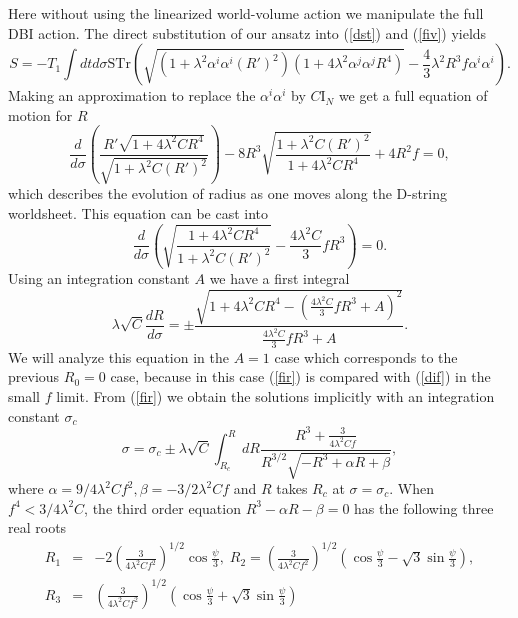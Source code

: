 \documentclass[12pt,a4paper]{article}
\newcommand{\la}{\lambda}
\newcommand{\al}{\alpha}
\begin{document}
Here without using the linearized world-volume action we manipulate
the full DBI action. The direct substitution of our ansatz into 
(\ref{dst}) and (\ref{fiv}) yields
\begin{equation}
S = -T_1 \int dtd\sigma \mathrm{STr} (\sqrt{(1+\la^2\al^i\al^i(R')^2)
(1 + 4\la^2\al^j\al^jR^4)} - \frac{4}{3}\la^2R^3f\al^i\al^i ).
\label{ful}\end{equation}
Making an approximation to replace the $\al^i\al^i$ by $C\mathrm{I}_N$
we get a full equation of motion for $R$
\begin{equation}
\frac{d}{d\sigma} \left( \frac{R'\sqrt{1+4\la^2CR^4}}
{\sqrt{1+\la^2C(R')^2}}\right) - 8R^3 
\sqrt{\frac{1+\la^2C(R')^2}{1+4\la^2CR^4}} + 4R^2f = 0,
\end{equation}
which describes the evolution of radius as one moves along the 
D-string worldsheet.
This equation can be cast into
\begin{equation}
\frac{d}{d\sigma}\left( \sqrt{\frac{1+4\la^2CR^4}{1+\la^2C(R')^2}}
- \frac{4\la^2C}{3}fR^3 \right) = 0.
\label{cas}\end{equation}
Using an integration constant $A$ we have a first integral
\begin{equation}
\la\sqrt{C}\frac{dR}{d\sigma} = \pm \frac{\sqrt{1+4\la^2CR^4-
(\frac{4\la^2C}{3}fR^3 + A)^2}}{\frac{4\la^2C}{3}fR^3 + A}.
\label{fir}\end{equation}
We will analyze this equation in the $A=1$ case which corresponds to the
previous $R_0 = 0$ case, because in this case (\ref{fir}) is compared
with (\ref{dif}) in the small $f$ limit. From (\ref{fir}) we obtain
the solutions implicitly with an integration constant $\sigma_c$
\begin{equation}
\sigma = \sigma_c \pm \la\sqrt{C}\int_{R_c}^{R}dR \frac{R^3 + 
\frac{3}{4\la^2Cf}} {R^{3/2}\sqrt{-R^3 + \al R + \beta}},
\label{ims}\end{equation}
where $\al = 9/4\la^2Cf^2, \beta = -3/2\la^2Cf$ and $R$ takes $R_c$ at
$\sigma = \sigma_c$. When $f^4 < 3/4\la^2C$, the third order equation
$R^3 - \al R - \beta =0$ has the following three real roots
\begin{eqnarray}
R_1 &=&-2\left(\frac{3}{4\la^2Cf^2}\right)^{1/2}\cos\frac{\psi}{3},
\; R_2 =  \left(\frac{3}{4\la^2Cf^2}\right)^{1/2}(\cos\frac{\psi}{3}
-\sqrt{3}\sin\frac{\psi}{3}), \nonumber \\
R_3 &=&  \left(\frac{3}{4\la^2Cf^2}\right)^{1/2}(\cos\frac{\psi}{3}
+ \sqrt{3}\sin\frac{\psi}{3})
\label{rad}\end{eqnarray}
\end{document}
